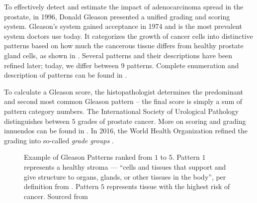To effectively detect and estimate the impact of adenocarcinoma spread in the prostate, in 1996, Donald Gleason presented a unified grading and scoring system.
Gleason's system gained acceptance in 1974 and is the most prevalent system doctors use today.
It categorizes the growth of cancer cells into distinctive patterns based on how much the cancerous tissue differs from healthy prostate gland cells, as shown in .
Several patterns and their descriptions have been refined later; today, we differ between 9 patterns. Complete enumeration and description of patterns can be found in \cite{gleason-patterns}.

To calculate a Gleason score, the histopathologist determines the predominant and second most common Gleason pattern -- the final score is simply a sum of pattern category numbers. The International Society of Urological Pathology distinguishes between $5$ grades of prostate cancer. More on scoring and grading innuendos can be found in \cite{gleason-pattern-grading}.
In 2016, the World Health Organization refined the grading into so-called \emph{grade groups} \cite{who-grade-groups}.

\begin{figure}
    \begin{center}
    \begin{minipage}{1\textwidth}
    \end{minipage}
    \caption{Example of Gleason Patterns ranked from $1$ to $5$. Pattern $1$ represents a healthy stroma --- ``cells and tissues that support and give structure to organs, glands, or other tissues in the body'', per definition from \cite{nci-stroma}. Pattern $5$ represents tissue with the highest risk of cancer. Sourced from \cite{gleason-pattern-description}}
    \label{fig:gp}
    \end{center}
\end{figure}

